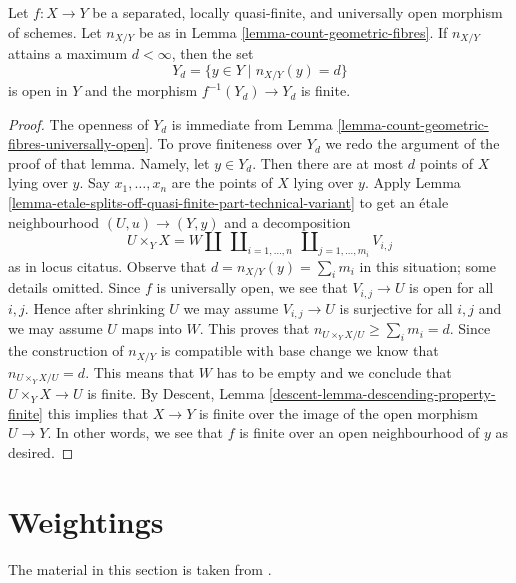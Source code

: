 \begin{lemma}
\label{lemma-large-open}
Let $f : X \to Y$ be a separated, locally quasi-finite, and universally open
morphism of schemes. Let $n_{X/Y}$ be as in
Lemma \ref{lemma-count-geometric-fibres}.
If $n_{X/Y}$ attains a maximum $d < \infty$, then the set
$$
Y_d = \{y \in Y \mid n_{X/Y}(y) = d\}
$$
is open in $Y$ and the morphism $f^{-1}(Y_d) \to Y_d$ is finite.
\end{lemma}

\begin{proof}
The openness of $Y_d$ is immediate from
Lemma \ref{lemma-count-geometric-fibres-universally-open}.
To prove finiteness over $Y_d$ we redo the argument of the
proof of that lemma. Namely, let $y \in Y_d$. Then there are
at most $d$ points of $X$ lying over $y$. Say
$x_1, \ldots, x_n$ are the points of $X$
lying over $y$. Apply
Lemma \ref{lemma-etale-splits-off-quasi-finite-part-technical-variant}
to get an \'etale neighbourhood $(U, u) \to (Y, y)$ and a decomposition
$$
U \times_Y X =
W \amalg
\ \coprod\nolimits_{i = 1, \ldots, n}
\ \coprod\nolimits_{j = 1, \ldots, m_i}
V_{i, j}
$$
as in locus citatus. Observe that $d = n_{X/Y}(y) = \sum_i m_i$
in this situation; some details omitted.
Since $f$ is universally open, we see
that $V_{i, j} \to U$ is open for all $i, j$. Hence after shrinking
$U$ we may assume $V_{i, j} \to U$ is surjective
for all $i, j$ and we may assume $U$ maps into $W$.
This proves that $n_{U \times_Y X/U} \geq \sum_i m_i = d$.
Since the construction of $n_{X/Y}$ is compatible with
base change we know that $n_{U \times_Y X/U} = d$. This means that
$W$ has to be empty and we conclude that $U \times_Y X \to U$ is finite.
By Descent, Lemma \ref{descent-lemma-descending-property-finite}
this implies that $X \to Y$ is finite over
the image of the open morphism $U \to Y$. In other words,
we see that $f$ is finite over an open neighbourhood of $y$
as desired.
\end{proof}






\section{Weightings}
\label{section-weightings}

\noindent
The material in this section is taken from \cite[Exposee XVII, 6.2.4]{SGA4}.

